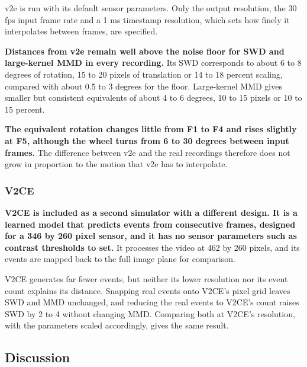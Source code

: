 v2e is run with its default sensor parameters. Only the output resolution, the 30 fps input frame rate and a 1 ms timestamp resolution, which sets how finely it interpolates between frames, are specified.

\textbf{Distances from v2e remain well above the noise floor for SWD and large-kernel MMD in every recording.} Its SWD corresponds to about 6 to 8 degrees of rotation, 15 to 20 pixels of translation or 14 to 18 percent scaling, compared with about 0.5 to 3 degrees for the floor. Large-kernel MMD gives smaller but consistent equivalents of about 4 to 6 degrees, 10 to 15 pixels or 10 to 15 percent.

\textbf{The equivalent rotation changes little from F1 to F4 and rises slightly at F5, although the wheel turns from 6 to 30 degrees between input frames.} The difference between v2e and the real recordings therefore does not grow in proportion to the motion that v2e has to interpolate.

\subsubsection{V2CE}

\textbf{V2CE is included as a second simulator with a different design. It is a learned model that predicts events from consecutive frames, designed for a 346 by 260 pixel sensor, and it has no sensor parameters such as contrast thresholds to set.} It processes the video at 462 by 260 pixels, and its events are mapped back to the full image plane for comparison.

V2CE generates far fewer events, but neither its lower resolution nor its event count explains its distance. Snapping real events onto V2CE's pixel grid leaves SWD and MMD unchanged, and reducing the real events to V2CE's count raises SWD by 2 to 4 without changing MMD. Comparing both at V2CE's resolution, with the parameters scaled accordingly, gives the same result.

\subsection{Discussion}

